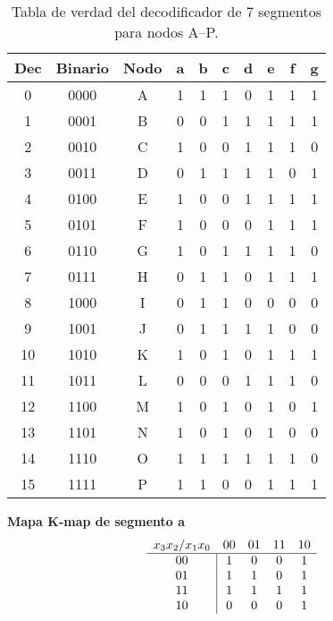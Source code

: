 \documentclass[12pt]{article}
\begin{document}

\begin{table}[h!]
\centering
\begin{tabular}{|c|c|c||c|c|c|c|c|c|c|}
\hline
\textbf{Dec} & \textbf{Binario} & \textbf{Nodo} 
  & \textbf{a} & \textbf{b} & \textbf{c} & \textbf{d} & \textbf{e} & \textbf{f} & \textbf{g} \\
\hline
0  & 0000 & A & 1 & 1 & 1 & 0 & 1 & 1 & 1 \\  
1  & 0001 & B & 0 & 0 & 1 & 1 & 1 & 1 & 1 \\  
2  & 0010 & C & 1 & 0 & 0 & 1 & 1 & 1 & 0 \\  
3  & 0011 & D & 0 & 1 & 1 & 1 & 1 & 0 & 1 \\  
4  & 0100 & E & 1 & 0 & 0 & 1 & 1 & 1 & 1 \\  
5  & 0101 & F & 1 & 0 & 0 & 0 & 1 & 1 & 1 \\  
6  & 0110 & G & 1 & 0 & 1 & 1 & 1 & 1 & 0 \\  
7  & 0111 & H & 0 & 1 & 1 & 0 & 1 & 1 & 1 \\  
8  & 1000 & I & 0 & 1 & 1 & 0 & 0 & 0 & 0 \\  
9  & 1001 & J & 0 & 1 & 1 & 1 & 1 & 0 & 0 \\  
10 & 1010 & K & 1 & 0 & 1 & 0 & 1 & 1 & 1 \\  
11 & 1011 & L & 0 & 0 & 0 & 1 & 1 & 1 & 0 \\  
12 & 1100 & M & 1 & 0 & 1 & 0 & 1 & 0 & 1 \\  
13 & 1101 & N & 1 & 0 & 1 & 0 & 1 & 0 & 0 \\  
14 & 1110 & O & 1 & 1 & 1 & 1 & 1 & 1 & 0 \\  
15 & 1111 & P & 1 & 1 & 0 & 0 & 1 & 1 & 1 \\  
\hline
\end{tabular}
\caption{Tabla de verdad del decodificador de 7 segmentos para nodos A–P.}
\label{tab:7seg_decoder}
\end{table}

\bigskip

\noindent
\textbf{Mapa K‐map de segmento \textsf{a}}  
\[
\begin{array}{c|cccc}
\multicolumn{1}{c}{x_3x_2 / x_1x_0} & 00 & 01 & 11 & 10 \\
\hline
00 & 1 & 0 & 0 & 1 \\
01 & 1 & 1 & 0 & 1 \\
11 & 1 & 1 & 1 & 1 \\
10 & 0 & 0 & 0 & 1 \\
\end{array}
\]
\vspace{1em}
\end{document}
